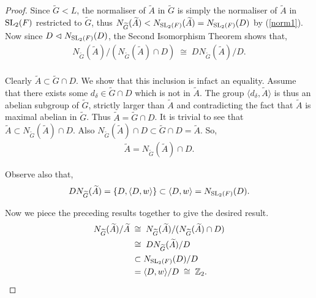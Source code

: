 \begin{footnotesize}
\begin{proof}
  Since ${\widetilde{G}} < L$, the normaliser of ${\widetilde{A}}$ in ${\widetilde{G}}$ is simply the normaliser of ${\widetilde{A}}$ in $\operatorname{SL}_2(F)$ restricted to ${\widetilde{G}}$, thus $N_{\widetilde{G}}({\widetilde{A}}) < N_{\operatorname{SL}_2(F)}({\widetilde{A}}) = N_{\operatorname{SL}_2(F)}(D)$ by (\ref{norm1}). Now since $D \vartriangleleft N_{\operatorname{SL}_2(F)}(D)$, the Second Isomorphism Theorem shows that,
  \begin{align}\label{2iso} N_{\widetilde{G}}({\widetilde{A}})/( N_{\widetilde{G}}({\widetilde{A}}) \cap D) \; \cong \; DN_{\widetilde{G}}({\widetilde{A}}) / D.
  \end{align}
  \\
  Clearly ${\widetilde{A}} \subset {\widetilde{G}} \cap D$. We show that this inclusion is infact an equality. Assume that there exists some $d_\delta \in  {\widetilde{G}} \cap D$ which is not in ${\widetilde{A}}$. The group $\langle d_\delta , {\widetilde{A}} \rangle$ is thus an abelian subgroup of ${\widetilde{G}}$, strictly larger than ${\widetilde{A}}$ and contradicting the fact that ${\widetilde{A}}$ is maximal abelian in ${\widetilde{G}}$. Thus ${\widetilde{A}} =  {\widetilde{G}} \cap D$. It is trivial to see that ${\widetilde{A}} \subset N_{\widetilde{G}}({\widetilde{A}}) \cap D$. Also $N_{\widetilde{G}}({\widetilde{A}}) \cap D \subset {\widetilde{G}} \cap D = {\widetilde{A}}$. So,
  \begin{align}\label{parti} {\widetilde{A}} =  N_{\widetilde{G}}({\widetilde{A}}) \cap D.
  \end{align}
  
  Observe also that, 
  \begin{align}\label{index1or2} DN_{\widetilde{G}}({\widetilde{A}}) = \{ D, \langle D, w \rangle \} \subset \langle D, w \rangle = N_{\operatorname{SL}_2(F)}(D).
  \end{align}
  
  Now we piece the preceding results together to give the desired result.
  \begin{align*}  N_{\widetilde{G}}({\widetilde{A}}) / {\widetilde{A}} \; & \cong \;  N_{\widetilde{G}}({\widetilde{A}})/( N_{\widetilde{G}}({\widetilde{A}}) \cap D) %
  \\ & \cong \; DN_{\widetilde{G}}({\widetilde{A}}) / D %
  \\ & \subset N_{\SL_2(F)}(D) / D %
  \\ &= \langle D, w \rangle / D \; \cong \; \mathbb{Z}_2.
  \end{align*}
  

\end{proof}
\end{footnotesize}
